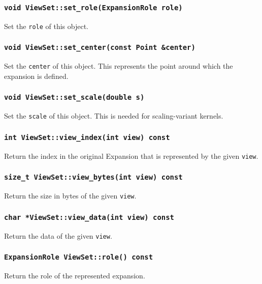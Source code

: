 \subsubsection{\texttt{void ViewSet::set\_role(ExpansionRole role)}}

Set the \texttt{role} of this object.

\subsubsection{\texttt{void ViewSet::set\_center(const Point \&center)}}

Set the \texttt{center} of this object. This represents the point around
which the expansion is defined.

\subsubsection{\texttt{void ViewSet::set\_scale(double s)}}

Set the \texttt{scale} of this object. This is needed for scaling-variant
kernels.

\subsubsection{\texttt{int ViewSet::view\_index(int view) const}}

Return the index in the original Expansion that is represented by the
given \texttt{view}.

\subsubsection{\texttt{size\_t ViewSet::view\_bytes(int view) const}}

Return the size in bytes of the given \texttt{view}.

\subsubsection{\texttt{char *ViewSet::view\_data(int view) const}}

Return the data of the given \texttt{view}.

\subsubsection{\texttt{ExpansionRole ViewSet::role() const}}

Return the role of the represented expansion.

